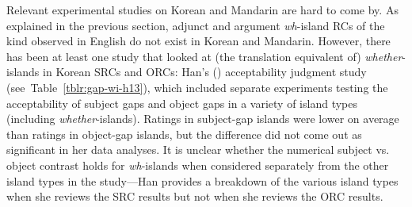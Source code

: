 Relevant experimental studies on Korean and Mandarin are hard to come by. As explained in the previous section, adjunct and argument \textit{wh}-island RCs of the kind observed in English do not exist in Korean and Mandarin. However, there has been at least one study that looked at (the translation equivalent of) \textit{whether}-islands in Korean SRCs and ORCs: Han's (\citeyear{han2013}) acceptability judgment study (see~Table~\ref{tblr:gap-wi-h13}), which included separate experiments testing the acceptability of subject gaps and object gaps in a variety of island types (including \textit{whether}-islands). Ratings in subject-gap islands were lower on average than ratings in object-gap islands, but the difference did not come out as significant in her data analyses. It is unclear whether the numerical subject vs. object contrast holds for \textit{wh}-islands when considered separately from the other island types in the study---Han provides a breakdown of the various island types when she reviews the SRC results but not when she reviews the ORC results. 


